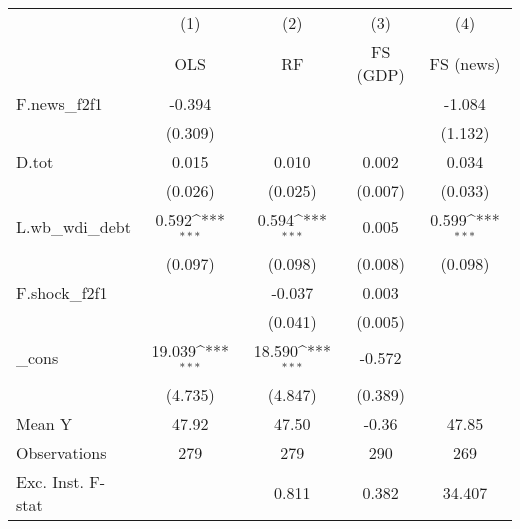 {
\def\sym#1{\ifmmode^{#1}\else\(^{#1}\)\fi}
\begin{tabular}{l*{4}{c}}
\toprule
            &\multicolumn{1}{c}{(1)}&\multicolumn{1}{c}{(2)}&\multicolumn{1}{c}{(3)}&\multicolumn{1}{c}{(4)}\\
            &\multicolumn{1}{c}{OLS}&\multicolumn{1}{c}{RF}&\multicolumn{1}{c}{FS (GDP)}&\multicolumn{1}{c}{FS (news)}\\
\midrule
F.news\_f2f1 &      -0.394         &                     &                     &      -1.084         \\
            &     (0.309)         &                     &                     &     (1.132)         \\
\addlinespace
D.tot       &       0.015         &       0.010         &       0.002         &       0.034         \\
            &     (0.026)         &     (0.025)         &     (0.007)         &     (0.033)         \\
\addlinespace
L.wb\_wdi\_debt&       0.592\sym{***}&       0.594\sym{***}&       0.005         &       0.599\sym{***}\\
            &     (0.097)         &     (0.098)         &     (0.008)         &     (0.098)         \\
\addlinespace
F.shock\_f2f1&                     &      -0.037         &       0.003         &                     \\
            &                     &     (0.041)         &     (0.005)         &                     \\
\addlinespace
\_cons      &      19.039\sym{***}&      18.590\sym{***}&      -0.572         &                     \\
            &     (4.735)         &     (4.847)         &     (0.389)         &                     \\
\midrule
Mean Y      &       47.92         &       47.50         &       -0.36         &       47.85         \\
Observations&         279         &         279         &         290         &         269         \\
Exc. Inst. F-stat&                     &       0.811         &       0.382         &      34.407         \\
\bottomrule
\end{tabular}
}
